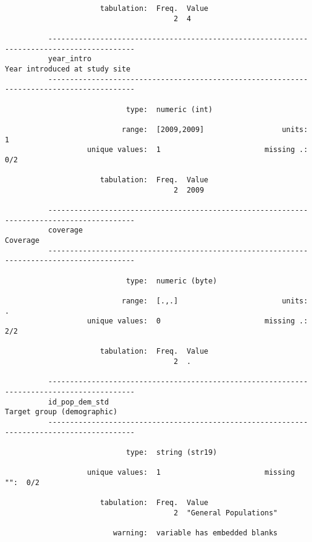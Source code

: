 \documentclass{article}
\begin{document}
\begin{verbatim}
                      tabulation:  Freq.  Value
                                       2  4
          
          ------------------------------------------------------------------------------------------
          year_intro                                                   Year introduced at study site
          ------------------------------------------------------------------------------------------
          
                            type:  numeric (int)
          
                           range:  [2009,2009]                  units:  1
                   unique values:  1                        missing .:  0/2
          
                      tabulation:  Freq.  Value
                                       2  2009
          
          ------------------------------------------------------------------------------------------
          coverage                                                                          Coverage
          ------------------------------------------------------------------------------------------
          
                            type:  numeric (byte)
          
                           range:  [.,.]                        units:  .
                   unique values:  0                        missing .:  2/2
          
                      tabulation:  Freq.  Value
                                       2  .
          
          ------------------------------------------------------------------------------------------
          id_pop_dem_std                                                  Target group (demographic)
          ------------------------------------------------------------------------------------------
          
                            type:  string (str19)
          
                   unique values:  1                        missing "":  0/2
          
                      tabulation:  Freq.  Value
                                       2  "General Populations"
          
                         warning:  variable has embedded blanks
          

\end{verbatim}
\end{document}
